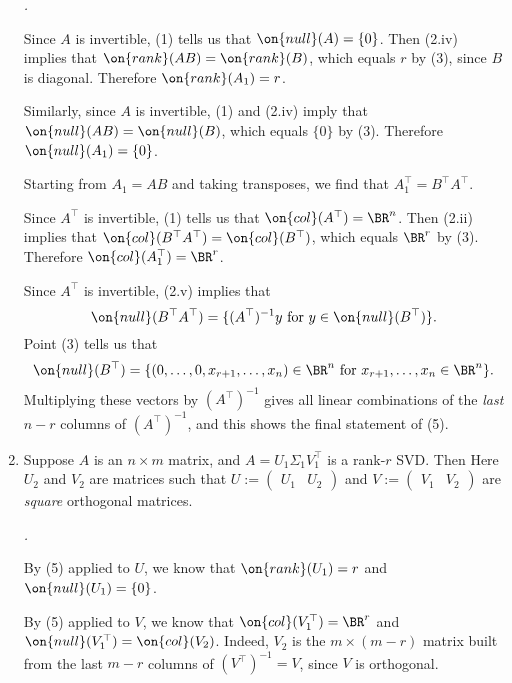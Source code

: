 \documentclass[10pt]{amsart}
\makeatletter
\renewenvironment{proof}[1][\proofname]{\par
	\pushQED{\qed}%
	\normalfont \topsep6\p@\@plus6\p@\relax
	\noindent\emph{#1.} 
	\ignorespaces
}{%
\popQED\endtrivlist\@endpefalse
}
\theoremstyle{mythm}
\theoremstyle{definition}
\theoremstyle{myrmk}
\newenvironment{myproof}{\color{blue}\begin{proof}}{\end{proof}}
\makeatother
\begin{document}
\begin{enumerate}[label=(\arabic*)]
\begin{myproof}
			Since $A$ is invertible, (1) tells us that $\on{null}(A) = \{0\}$. Then (2.iv) implies that $\on{rank}(AB) = \on{rank}(B)$, which equals $r$ by (3), since $B$ is diagonal. Therefore $\on{rank}(A_1) = r$. 
			
			Similarly, since $A$ is invertible, (1) and (2.iv) imply that $\on{null}(AB) = \on{null}(B)$, which equals $\{0\}$ by (3). Therefore $\on{null}(A_1) = \{0\}$. 
			
			Starting from $A_1 = AB$ and taking transposes, we find that $A_1^\top = B^\top A^\top$. 
			
			Since $A^\top$ is invertible, (1) tells us that $\on{col}(A^\top) = \BR^n$. Then (2.ii) implies that $\on{col}(B^\top A^\top) = \on{col}(B^\top)$, which equals $\BR^r$ by (3). Therefore $\on{col}(A_1^\top) = \BR^r$. 
			
			Since $A^\top$ is invertible, (2.v) implies that 
			\[
				\on{null}(B^\top A^\top) = \{(A^\top)^{-1}y \text{ for } y \in \on{null}(B^\top)\}. 
			\]
			Point (3) tells us that 
			\[
				\on{null}(B^\top) = \{(0, \ldots, 0, x_{r+1}, \ldots, x_n) \in \BR^n \text{ for } x_{r+1}, \ldots, x_n \in \BR^n\}. 
			\]
			Multiplying these vectors by $(A^\top)^{-1}$ gives all linear combinations of the \emph{last} $n-r$ columns of $(A^\top)^{-1}$, and this shows the final statement of (5). 			
		\end{myproof}
		\item Suppose $A$ is an $n \times m$ matrix, and $A = U_1\Sigma_1 V_1^\top$ is a rank-$r$ SVD. Then 
		Here $U_2$ and $V_2$ are matrices such that $U := \left( \begin{array}{c|c} U_1 & U_2 \end{array} \right)$ and $V := \left( \begin{array}{c|c} V_1 & V_2 \end{array} \right)$ are \emph{square} orthogonal matrices. 
		\begin{myproof}
			By (5) applied to $U$, we know that $\on{rank}(U_1) = r$ and $\on{null}(U_1) = \{0\}$. 
			
			By (5) applied to $V$, we know that $\on{col}(V_1^\top) = \BR^r$ and $\on{null}(V_1^\top) = \on{col}(V_2)$. Indeed, $V_2$ is the $m \times (m-r)$ matrix built from the last $m-r$ columns of $(V^\top)^{-1} = V$, since $V$ is orthogonal. 
			

\end{myproof}
\end{enumerate}
\end{document}
